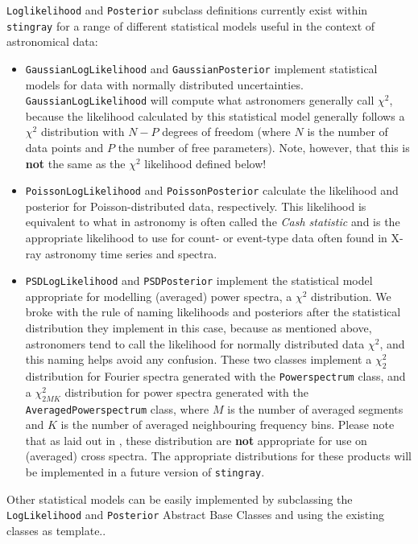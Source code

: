 \documentclass[12pt]{emulateapj}
\newcommand{\stingray}{\texttt{stingray}\xspace}
\newcommand{\powerspectrum}{\texttt{Powerspectrum}\xspace}
\begin{document}
\verb|Loglikelihood| and \verb|Posterior| subclass definitions currently exist within \stingray for a range of different statistical models useful in the context of astronomical data:
\begin{itemize}
\item{\verb|GaussianLogLikelihood| and \verb|GaussianPosterior| implement statistical models for data with normally distributed uncertainties. \verb|GaussianLogLikelihood| will compute what astronomers generally call $\chi^2$, because the likelihood calculated by this statistical model generally follows a $\chi^2$ distribution with $N-P$ degrees of freedom (where $N$ is the number of data points and $P$ the number of free parameters). Note, however, that this is \textbf{not} the same as the $\chi^2$ likelihood defined below!}
\item{\verb|PoissonLogLikelihood| and \verb|PoissonPosterior| calculate the likelihood and posterior for Poisson-distributed data, respectively. This likelihood is equivalent to what in astronomy is often called the \textit{Cash statistic} \citep{cash1979} and is the appropriate likelihood to use for count- or event-type data often found in X-ray astronomy time series and spectra.}
\item{\verb|PSDLogLikelihood| and \verb|PSDPosterior| implement the statistical model appropriate for modelling (averaged) power spectra, a $\chi^2$ distribution. We broke with the rule of naming likelihoods and posteriors after the statistical distribution they implement in this case, because as mentioned above, astronomers tend to call the likelihood for normally distributed data $\chi^2$, and this naming helps avoid any confusion. These two classes implement a $\chi^2_2$ distribution for Fourier spectra generated with the \powerspectrum class, and a $\chi^2_{2MK}$ distribution for power spectra generated with the \texttt{AveragedPowerspectrum} class, where $M$ is the number of averaged segments and $K$ is the number of averaged neighbouring frequency bins. Please note that as laid out in \citet{huppenkothen2017}, these distribution are \textbf{not} appropriate for use on (averaged) cross spectra. The appropriate distributions for these products will be implemented in a future version of \stingray.}
\end{itemize}

Other statistical models can be easily implemented by subclassing the \verb|LogLikelihood| and \verb|Posterior| Abstract Base Classes and using the existing classes as template..
\end{document}
